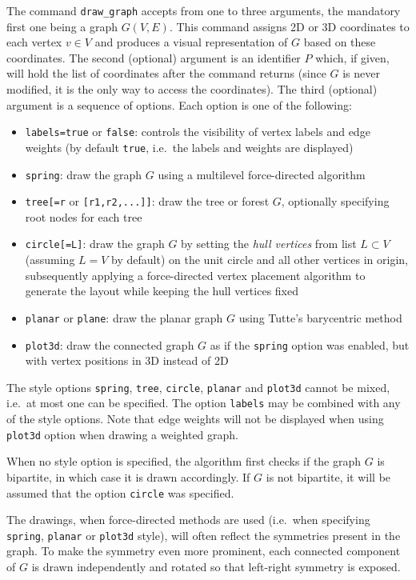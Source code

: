 \documentclass[a4paper,11pt]{article}
\begin{document}
The command {\tt draw\_graph} accepts from one to three arguments, the mandatory first one being a graph $ G(V,E) $. This command assigns 2D or 3D coordinates to each vertex $ v\in V $ and produces a visual representation of $ G $ based on these coordinates. The second (optional) argument is an identifier $ P $ which, if given, will hold the list of coordinates after the command returns (since $ G $ is never modified, it is the only way to access the coordinates). The third (optional) argument is a sequence of options. Each option is one of the following:
\begin{itemize}
  \item {\tt labels=true} or {\tt false}: controls the visibility of vertex labels and edge weights (by default {\tt true}, i.e.~the labels and weights are displayed)
  \item {\tt spring}: draw the graph $ G $ using a multilevel force-directed algorithm
  \item {\tt tree[=r} or {\tt [r1,r2,...]]}: draw the tree or forest $ G $, optionally specifying root nodes for each tree
  \item {\tt circle[=L]}: draw the graph $ G $ by setting the {\it hull vertices} from list $ L\subset V $ (assuming $ L=V $ by default) on the unit circle and all other vertices in origin, subsequently applying a force-directed vertex placement algorithm to generate the layout while keeping the hull vertices fixed
  \item {\tt planar} or {\tt plane}: draw the planar graph $ G $ using Tutte's barycentric method
  \item {\tt plot3d}: draw the connected graph $ G $ as if the {\tt spring} option was enabled, but with vertex positions in 3D instead of 2D
\end{itemize}
The style options {\tt spring}, {\tt tree}, {\tt circle}, {\tt planar} and {\tt plot3d} cannot be mixed, i.e.~at most one can be specified. The option {\tt labels} may be combined with any of the style options. Note that edge weights will not be displayed when using {\tt plot3d} option when drawing a weighted graph.

When no style option is specified, the algorithm first checks if the graph $ G $ is bipartite, in which case it is drawn accordingly. If $ G $ is not bipartite, it will be assumed that the option {\tt circle} was specified.

The drawings, when force-directed methods are used (i.e.~when specifying {\tt spring}, {\tt planar} or {\tt plot3d} style), will often reflect the symmetries present in the graph. To make the symmetry even more prominent, each connected component of $ G $ is drawn independently and rotated so that left-right symmetry is exposed.
\end{document}
